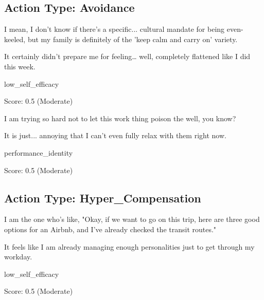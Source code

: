 \subsection*{Action Type: Avoidance}
\begin{tcolorbox}[
    colback=gray!5, colframe=gray!50, arc=2mm, boxrule=0.5pt,
    left=5pt, right=5pt, enhanced, drop shadow, breakable
]
\begin{description}[leftmargin=3.5cm, labelwidth=3.2cm, font=\bfseries, nosep]
    \item[Belief] I mean, I don't know if there's a specific... cultural mandate for being even-keeled, but my family is definitely of the 'keep calm and carry on' variety.
    \item[Action] It certainly didn't prepare me for feeling… well, completely flattened like I did this week.
    \item[Belief Type] low\_self\_efficacy
    \item[Metrics] Score: 0.5 (Moderate)
\end{description}
\end{tcolorbox}

\begin{tcolorbox}[
    colback=gray!5, colframe=gray!50, arc=2mm, boxrule=0.5pt,
    left=5pt, right=5pt, enhanced, drop shadow, breakable
]
\begin{description}[leftmargin=3.5cm, labelwidth=3.2cm, font=\bfseries, nosep]
    \item[Belief] I am trying so hard not to let this work thing poison the well, you know?
    \item[Action] It is just... annoying that I can't even fully relax with them right now.
    \item[Belief Type] performance\_identity
    \item[Metrics] Score: 0.5 (Moderate)
\end{description}
\end{tcolorbox}

\subsection*{Action Type: Hyper\_Compensation}
\begin{tcolorbox}[
    colback=gray!5, colframe=gray!50, arc=2mm, boxrule=0.5pt,
    left=5pt, right=5pt, enhanced, drop shadow, breakable
]
\begin{description}[leftmargin=3.5cm, labelwidth=3.2cm, font=\bfseries, nosep]
    \item[Belief] I am the one who's like, "Okay, if we want to go on this trip, here are three good options for an Airbnb, and I've already checked the transit routes."
    \item[Action] It feels like I am already managing enough personalities just to get through my workday.
    \item[Belief Type] low\_self\_efficacy
    \item[Metrics] Score: 0.5 (Moderate)
\end{description}
\end{tcolorbox}

